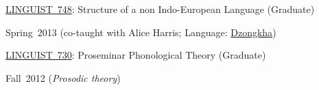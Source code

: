 \documentclass[10pt]{article}
\newcommand{\halfblankline}{\quad\vspace{-0.5\baselineskip}\pagebreak[3]}
\begin{document}
\begin{outerlist}
\begin{innerlist}
        \item \href{http://www.umass.edu/linguist/courses/detail.php?cid=481}{LINGUIST~748}:
          Structure of a non Indo-European Language (Graduate)
        \begin{innerlist}[\enskip$\circ$,leftmargin=*]
            \item Spring~2013 (co-taught with Alice Harris; Language: \href{http://www.ethnologue.com/language/dzo}{Dzongkha})
        \end{innerlist}

        \halfblankline

        \item \href{http://www.umass.edu/linguist/courses/detail.php?cid=427}{LINGUIST~730}:
          Proseminar Phonological Theory (Graduate)
        \begin{innerlist}[\enskip$\circ$,leftmargin=*]
            \item Fall~2012 (\emph{Prosodic theory})
        \end{innerlist}

    \end{innerlist}

\end{outerlist}

\halfblankline
\end{document}
